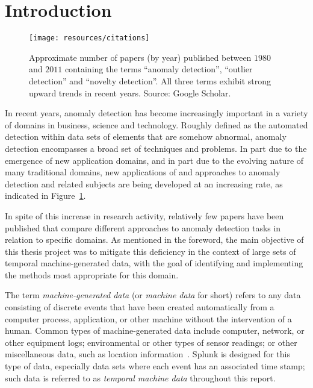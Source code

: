 \chapter*{Introduction}

\begin{figure}[htb]
    \vspace{-10pt}
    \begin{center}
        \texttt{[image: resources/citations]}
    \end{center}
    \vspace{-20pt}
    \caption{\small Approximate number of papers (by year) published between $1980$ and $2011$ containing the terms ``anomaly detection'', ``outlier detection'' and ``novelty detection''. All three terms exhibit strong upward trends in recent years. Source: Google Scholar.}
    \vspace{-0pt}
\label{fig:citations}
\end{figure}

In recent years, anomaly detection has become increasingly important in a variety of domains in business, science and technology. Roughly defined as the automated detection within data sets of elements that are somehow abnormal, anomaly detection encompasses a broad set of techniques and problems. In part due to the emergence of new application domains, and in part due to the evolving nature of many traditional domains, new applications of and approaches to anomaly detection and related subjects are being developed at an increasing rate, as indicated in Figure~\ref{fig:citations}.

In spite of this increase in research activity, relatively few papers have been published that compare different approaches to anomaly detection tasks in relation to specific domains. As mentioned in the foreword, the main objective of this thesis project was to mitigate this deficiency in the context of large sets of temporal machine-generated data, with the goal of identifying and implementing the methods most appropriate for this domain.

The term \emph{machine-generated data} (or \emph{machine data} for short) refers to any data consisting of discrete events that have been created automatically from a computer process, application, or other machine without the intervention of a human. Common types of machine-generated data include computer, network, or other equipment logs; environmental or other types of sensor readings; or other miscellaneous data, such as location information~\cite{machine_data}. Splunk is designed for this type of data, especially data sets where each event has an associated time stamp; such data is referred to as \emph{temporal machine data} throughout this report.

